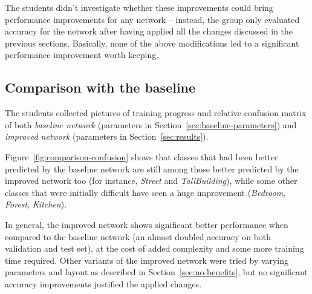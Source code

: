 \documentclass[a4paper, 11pt]{article} %
\begin{document}
The students didn't investigate whether these improvements could bring performance improvements for any network \--- instead, the group only evaluated accuracy for the network after having applied all the changes discussed in the previous sections. Basically, none of the above modifications led to a significant performance improvement worth keeping.


\subsection{Comparison with the baseline}\label{sec:baseline-comparison}

The students collected pictures of training progress and relative confusion matrix of both \emph{baseline network} (parameters in Section~\ref{sec:baseline-parameters}) and \emph{improved network} (parameters in Section~\ref{sec:results}).

Figure~\ref{fig:comparison-confusion} shows that classes that had been better predicted by the baseline network are still among those better predicted by the improved network too (for instance, \emph{Street} and \emph{TallBuilding}), while some other classes that were initially difficult have seen a huge improvement (\emph{Bedroom}, \emph{Forest}, \emph{Kitchen}).

In general, the improved network shows significant better performance when compared to the baseline network (an almost doubled accuracy on both validation and test set), at the cost of added complexity and some more training time required. Other variants of the improved network were tried by varying parameters and layout as described in Section~\ref{sec:no-benefits}, but no significant accuracy improvements justified the applied changes.
\end{document}
